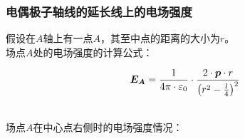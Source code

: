 \documentclass[UTF8]{ctexart}
\newcommand*{\veb}[1]{\vb*{#1}}
\begin{document}
\newpage

\subsubsection{电偶极子轴线的延长线上的电场强度}
    \setcounter{equation}{0}
    假设在$A$轴上有一点$A$，其至中点的距离的大小为$r$。\\[3mm]
    场点$A$处的电场强度的计算公式：
    \begin{large}
        \begin{equation*}
            \veb{E_A}=\frac{1}{4\pi\cdot\varepsilon_0}\cdot\frac{2\cdot \veb{p}\cdot r}{\left(r^2-\frac{l}{4}\right)^2}
        \end{equation*}
    \end{large}\\
    场点$A$在中心点右侧时的电场强度情况：
\end{document}
